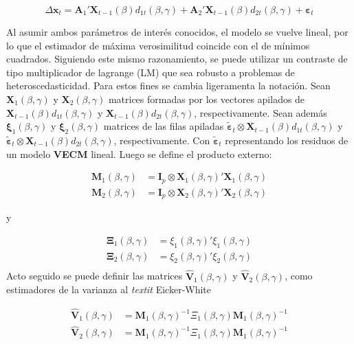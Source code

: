 \documentclass[12pt, twoside]{book}\usepackage[]{graphicx}\usepackage[]{color}
\numberwithin{equation}{section}
\numberwithin{theorem}{section}
\numberwithin{teorema}{section}
\numberwithin{defi}{section}
\numberwithin{prop}{section}
\numberwithin{defi}{section}
\theoremstyle{plain}
\begin{document}
\begin{equation}
\Delta \mathbf{x}_{t} = \mathbf{A}_{1}'\mathbf{X}_{t-1}(\beta)d_{1t}(\beta,\gamma)+\mathbf{A}_{2}'\mathbf{X}_{t-1}(\beta)d_{2t}(\beta,\gamma)+\boldsymbol{\varepsilon}_{t}
\end{equation}

Al asumir ambos parámetros de interés conocidos, el modelo se vuelve lineal, por lo que el estimador de máxima verosimilitud coincide con el de mínimos cuadrados. Siguiendo este mismo razonamiento, se puede utilizar un contraste de tipo multiplicador de lagrange (LM) que sea robusto a problemas de heteroscedasticidad. Para estos fines se cambia ligeramenta la notación. Sean $\mathbf{X}_{1}(\beta,\gamma)$ y $\mathbf{X}_{2}(\beta,\gamma)$ matrices formadas por los vectores apilados de $\mathbf{X}_{t-1}(\beta)d_{1t}(\beta,\gamma)$ y $\mathbf{X}_{t-1}(\beta)d_{2t}(\beta,\gamma)$, respectivamente. Sean además $\boldsymbol{\xi}_{1}(\beta,\gamma)$ y $\boldsymbol{\xi}_{2}(\beta,\gamma)$ matrices de las filas apiladas $\tilde{\boldsymbol{\varepsilon}}_{t}\otimes \mathbf{X}_{t-1}(\beta)d_{1t}(\beta,\gamma)$ y $\tilde{\boldsymbol{\varepsilon}}_{t}\otimes \mathbf{X}_{t-1}(\beta)d_{2t}(\beta,\gamma)$, respectivamente. Con $\tilde{\boldsymbol{\varepsilon}}_{t}$ representando los residuos de un modelo \textbf{VECM} lineal. Luego se define el producto externo:

\begin{align}
\mathbf{M}_{1}(\beta,\gamma) & = \mathbf{I}_{p}\otimes \mathbf{X}_{1}(\beta,\gamma)'\mathbf{X}_{1}(\beta,\gamma) \\
\mathbf{M}_{2}(\beta,\gamma) & = \mathbf{I}_{p}\otimes \mathbf{X}_{2}(\beta,\gamma)'\mathbf{X}_{2}(\beta,\gamma) 
\end{align}

y 

\begin{align}
\boldsymbol{\Xi}_{1}(\beta,\gamma) & = \xi_{1}(\beta,\gamma)'\xi_{1}(\beta,\gamma) \\ 
\boldsymbol{\Xi}_{2}(\beta,\gamma) & = \xi_{2}(\beta,\gamma)'\xi_{2}(\beta,\gamma) \\ 
\end{align}
Acto seguido se puede definir las matrices $\hat{\mathbf{V}}_{1}(\beta,\gamma)$ y $\hat{\mathbf{V}}_{2}(\beta,\gamma)$, como estimadores de la varianza al \textit{textit} Eicker-White

\begin{align}
\hat{\mathbf{V}}_{1}(\beta,\gamma) & = \mathbf{M}_{1}(\beta,\gamma)^{-1}\Xi_{1}(\beta,\gamma)\mathbf{M}_{1}(\beta,\gamma)^{-1}\\ 
\hat{\mathbf{V}}_{2}(\beta,\gamma) & = \mathbf{M}_{1}(\beta,\gamma)^{-1}\Xi_{1}(\beta,\gamma)\mathbf{M}_{1}(\beta,\gamma)^{-1}
\end{align}
\end{document}
